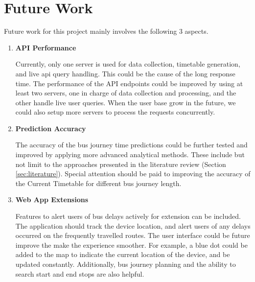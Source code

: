 \chapter{Future Work}
\par Future work for this project mainly involves the following 3 aspects.
\label{ch:future_work}
\begin{enumerate}
  \item \textbf{API Performance}
\par Currently, only one server is used for data collection, timetable generation, and live \acrshort{api} query handling. This could be the cause of the long response time. The performance of the API endpoints could be improved by using at least two servers, one in charge of data collection and processing, and the other handle live user queries. When the user base grow in the future, we could also setup more servers to process the requests concurrently.

\item \textbf{Prediction Accuracy}
\par The accuracy of the bus journey time predictions could be further tested and improved by applying more advanced analytical methods. These include but not limit to the approaches presented in the literature review (Section \ref{sec:literature}). Special attention should be paid to improving the accuracy of the Current Timetable for different bus journey length.

\item \textbf{Web App Extensions}
\par Features to alert users of bus delays actively for extension can be included. The application should track the device location, and alert users of any delays occurred on the frequently travelled routes. The user interface could be future improve the make the experience smoother. For example, a blue dot could be added to the map to indicate the current location of the device, and be updated constantly. Additionally, bus journey planning and the ability to search start and end stops are also helpful.
\end{enumerate}
